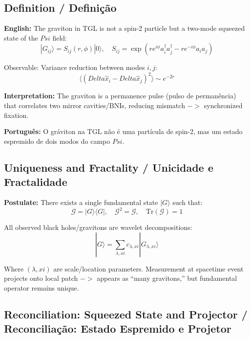 \documentclass[12pt,a4paper]{article}
\def\Psi{Psi}%
\def\to{ -> }%
\def\xi{xi}%
\def\Delta{Delta}%
\begin{document}
\subsection{Definition / Definição}

\textbf{English:} The graviton in TGL is not a spin-2 particle but a two-mode squeezed state of the $\Psi$ field:
\begin{equation}
|G_{ij}\rangle = S_{ij}(r,\phi)|0\rangle, \quad S_{ij} = \exp\left(r e^{i\phi}a_i^\dagger a_j^\dagger - r e^{-i\phi}a_i a_j\right)
\end{equation}

Observable: Variance reduction between modes $i,j$:
\begin{equation}
\langle(\Delta \hat{x}_i - \Delta \hat{x}_j)^2\rangle \sim e^{-2r}
\end{equation}

\textbf{Interpretation:} The graviton is a permanence pulse (pulso de permanência) that correlates two mirror cavities/BNIs, reducing mismatch $\to$ synchronized fixation.

\textbf{Português:} O gráviton na TGL não é uma partícula de spin-2, mas um estado espremido de dois modos do campo $\Psi$.

\subsection{Uniqueness and Fractality / Unicidade e Fractalidade}

\textbf{Postulate:} There exists a single fundamental state $|G\rangle$ such that:
\begin{equation}
\mathcal{G} = |G\rangle\langle G|, \quad \mathcal{G}^2 = \mathcal{G}, \quad \text{Tr}(\mathcal{G}) = 1
\end{equation}

All observed black holes/gravitons are wavelet decompositions:
\begin{equation}
|G\rangle = \sum_{\lambda,\xi} c_{\lambda,\xi}|G_{\lambda,\xi}\rangle
\end{equation}

Where $(\lambda,\xi)$ are scale/location parameters. Measurement at spacetime event projects onto local patch $\to$ appears as ``many gravitons,'' but fundamental operator remains unique.

\subsection{Reconciliation: Squeezed State and Projector / Reconciliação: Estado Espremido e Projetor}
\label{subsec:reconcile}
\end{document}
